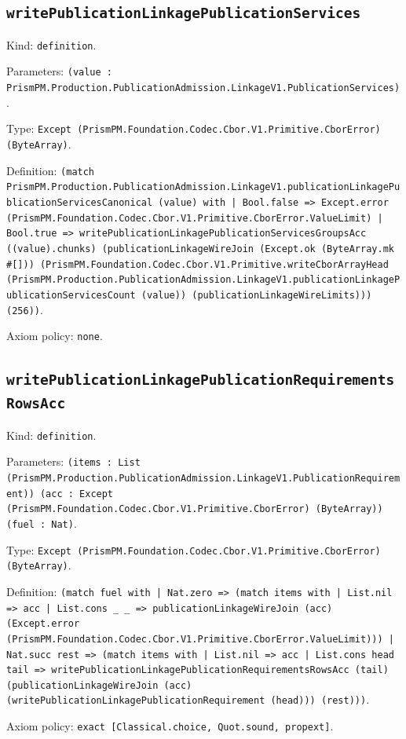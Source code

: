 \documentclass[11pt]{article}
\begin{document}
\subsection*{\texttt{writePublicationLinkagePublicationServices}}
\noindent Kind: \texttt{definition}.\par
\noindent Parameters: \texttt{(value : PrismPM.Production.PublicationAdmission.LinkageV1.PublicationServices)}.\par
\noindent Type: \texttt{Except (PrismPM.Foundation.Codec.Cbor.V1.Primitive.CborError) (ByteArray)}.\par
\noindent Definition: \texttt{(match PrismPM.Production.PublicationAdmission.LinkageV1.publicationLinkagePublicationServicesCanonical (value) with | Bool.false => Except.error (PrismPM.Foundation.Codec.Cbor.V1.Primitive.CborError.ValueLimit) | Bool.true => writePublicationLinkagePublicationServicesGroupsAcc ((value).chunks) (publicationLinkageWireJoin (Except.ok (ByteArray.mk \#[])) (PrismPM.Foundation.Codec.Cbor.V1.Primitive.writeCborArrayHead (PrismPM.Production.PublicationAdmission.LinkageV1.publicationLinkagePublicationServicesCount (value)) (publicationLinkageWireLimits))) (256))}.\par
\noindent Axiom policy: \texttt{none}.\par
\subsection*{\texttt{writePublicationLinkagePublicationRequirementsRowsAcc}}
\noindent Kind: \texttt{definition}.\par
\noindent Parameters: \texttt{(items : List (PrismPM.Production.PublicationAdmission.LinkageV1.PublicationRequirement)) (acc : Except (PrismPM.Foundation.Codec.Cbor.V1.Primitive.CborError) (ByteArray)) (fuel : Nat)}.\par
\noindent Type: \texttt{Except (PrismPM.Foundation.Codec.Cbor.V1.Primitive.CborError) (ByteArray)}.\par
\noindent Definition: \texttt{(match fuel with | Nat.zero => (match items with | List.nil => acc | List.cons \_ \_ => publicationLinkageWireJoin (acc) (Except.error (PrismPM.Foundation.Codec.Cbor.V1.Primitive.CborError.ValueLimit))) | Nat.succ rest => (match items with | List.nil => acc | List.cons head tail => writePublicationLinkagePublicationRequirementsRowsAcc (tail) (publicationLinkageWireJoin (acc) (writePublicationLinkagePublicationRequirement (head))) (rest)))}.\par
\noindent Axiom policy: \texttt{exact [Classical.choice, Quot.sound, propext]}.\par
\end{document}
